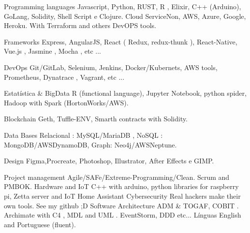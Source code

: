 \vspace{5mm}

\begin{cvskills}

  \cvskill
    {Programming languages} %
    {Javascript, Python, RUST, R , Elixir, C++ (Arduino), GoLang, Solidity, Shell Script e Clojure.} %
  \cvskill
    {Cloud} %
    { ServiceNon, AWS, Azure, Google, Heroku. With Terraform and others DevOPS tools.} %

  \cvskill
    {Frameworks} %
    {Express, AngularJS, React ( Redux, redux-thunk ), React-Native, Vue.js , Jasmine , Mocha ,  etc ...} %

\cvskill
    {DevOps} %
    {Git/GitLab, Selenium, Jenkins, Docker/Kubernets, AWS tools, Prometheus, Dynatrace , Vagrant, etc ...} %

 \cvskill
    {Estatística \& BigData} %
    { R (functional language), Jupyter Notebook, python spider, Hadoop with Spark (HortonWorks/AWS).
    } %

 \cvskill
    {Blockchain} %
    { Geth, Tuffle-ENV, Smarth contracts with Solidity.} %

 \cvskill
    {Data Bases} %
    {Relacional : MySQL/MariaDB , NoSQL : MongoDB/AWSDynamoDB, Graph: Neo4j/AWSNeptune.} %

 \cvskill
    {Design} %
    {Figma,Procreate, Photoshop, Illustrator, After Effects e GIMP.} %
    
 \cvskill
    {Project management} %
    {Agile/SAFe/Extreme-Programming/Clean. Scrum and PMBOK.} %
 \cvskill
    {Hardware and IoT} %
    { C++ with arduino, python libraries for raspberry pi, Zetta server and IoT Home Assistant} %
\cvskill
{Cybersecurity} %
{ Real hackers make their own tools. See my github ;D} %
\cvskill
{Software Architecture} %
{ ADM \& TOGAF, COBIT . Archimate with C4 , MDL and UML . EventStorm, DDD etc... } %
 \cvskill
 {Línguas} %
 { English and Portuguese (fluent).} %

\end{cvskills}
